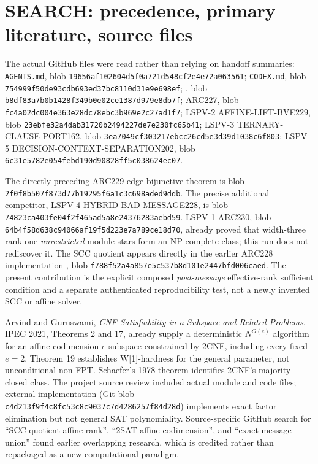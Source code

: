 \documentclass[11pt]{article}
\begin{document}
\section{SEARCH: precedence, primary literature, source files}
The actual GitHub files were read rather than relying on handoff summaries: \texttt{AGENTS.md}, blob \texttt{19656af102604d5f0a721d548cf2e4e72a063561}; \texttt{CODEX.md}, blob \texttt{754999f50de93cdb693ed37bc8110d31e9e698ef}; , blob \texttt{b8df83a7b0b1428f349b0e02ce1387d979e8db7f}; ARC227, blob \texttt{fc4a02dc004e363e28dc78ebc3b969e2c27ad1f7}; LSPV-2 AFFINE-LIFT-BVE229, blob \texttt{23ebfe32a4dab31720b2494227de7e230fc65b41}; LSPV-3 TERNARY-CLAUSE-PORT162, blob \texttt{3ea7049cf303217ebcc26cd5e3d39d1038c6f803}; LSPV-5 DECISION-CONTEXT-SEPARATION202, blob \texttt{6c31e5782e054febd190d90828ff5c038624ec07}.

The directly preceding ARC229 edge-bijunctive theorem is blob \texttt{2f0f8b507f873d77b19295f6a1c3c698aded9ddb}. The precise additional competitor, LSPV-4 HYBRID-BAD-MESSAGE228, is blob \texttt{74823ca403fe04f2f465ad5a8e24376283aebd59}. LSPV-1 ARC230, blob \texttt{64b4f58d638c94066af19f5d223e7a789ce18d70}, already proved that width-three rank-one \emph{unrestricted} module stars form an NP-complete class; this run does not rediscover it. The SCC quotient appears directly in the earlier ARC228 implementation , blob \texttt{f788f52a4a857e5c537b8d101e2447bfd006caed}. The present contribution is the explicit composed \emph{post-message} effective-rank sufficient condition and a separate authenticated reproducibility test, not a newly invented SCC or affine solver.

Arvind and Guruswami, \emph{CNF Satisfiability in a Subspace and Related Problems}, IPEC 2021, Theorems 2 and 17, already supply a deterministic $N^{O(e)}$ algorithm for an affine codimension-$e$ subspace constrained by 2CNF, including every fixed $e=2$. Theorem 19 establishes W[1]-hardness for the general parameter, not unconditional non-FPT. Schaefer's 1978 theorem identifies 2CNF's majority-closed class. The project source review included actual module and code files; external implementation  (Git blob \texttt{c4d213f9f4c8fc53c8c9037c7d4286257f84d28d}) implements exact factor elimination but not general SAT polynomiality. Source-specific GitHub search for ``SCC quotient affine rank'', ``2SAT affine codimension'', and ``exact message union'' found earlier overlapping research, which is credited rather than repackaged as a new computational paradigm.
\end{document}
